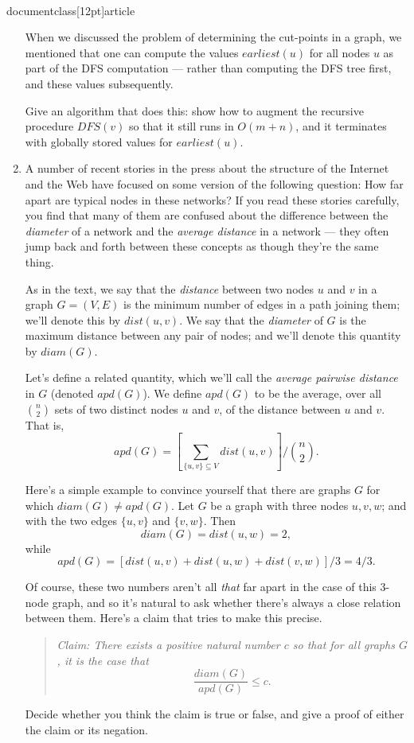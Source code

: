 \\documentclass[12pt]{article}
\begin{document}
\begin{enumerate}
When we discussed the problem of determining the
cut-points in a graph, 
we mentioned that one can compute the values
${earliest}(u)$ for all nodes $u$ as
part of the DFS computation --- rather than computing
the DFS tree first, and these values subsequently.

Give an algorithm that does this:
show how to augment the recursive procedure 
$DFS(v)$ so that it still runs in $O(m + n)$,
and it terminates with globally stored values
for ${earliest}(u)$.


\item 

A number of recent stories in the press about
the structure of the Internet and the Web
have focused on some version of the following question:
How far apart are typical nodes in these networks?
If you read these stories carefully,
you find that many of them are confused about the difference
between the {\em diameter} of a network and
the {\em average distance} in a network ---
they often jump back and forth between these
concepts as though they're the same thing.

As in the text, we say that the {\em distance} between
two nodes $u$ and $v$ in a graph $G = (V,E)$
is the minimum number
of edges in a path joining them;
we'll denote this by $dist(u,v)$.
We say that the
{\em diameter} of $G$ is the maximum distance between
any pair of nodes; and
we'll denote this quantity by $diam(G)$.

Let's define a related quantity, which we'll call
the {\em average pairwise distance} in $G$
(denoted $apd(G)$).
We define $apd(G)$ to be the average, over all ${n \choose 2}$
sets of two distinct nodes $u$ and $v$, of the distance
between $u$ and $v$.
That is,
$$apd(G) = \left[ \sum_{\{u, v\} \subseteq V} dist(u,v) \right] / {{n \choose 2}}.$$

Here's a simple example to convince yourself that there
are graphs $G$ for which $diam(G) \neq apd(G)$.
Let $G$ be a graph with three nodes $u, v, w$;
and with the two edges $\{u,v\}$ and $\{v,w\}$.
Then $$diam(G) = dist(u,w) = 2,$$
while
$$apd(G) = [dist(u,v) + dist(u,w) + dist(v,w)] / 3 = 4/3.$$

Of course, these two numbers aren't all {\em that} far apart
in the case of this 3-node graph, and so it's natural
to ask whether there's always a close relation between them.
Here's a claim that tries to make this precise.
\begin{quote}
{\em Claim: There exists a positive natural number $c$ so that
for all graphs $G$, it is the case that
$$\frac{diam(G)}{apd(G)} \leq c.$$}
\end{quote}
Decide whether you think the claim is true or false,
and give a proof of either the claim or its negation.


\end{enumerate}
\end{document}
